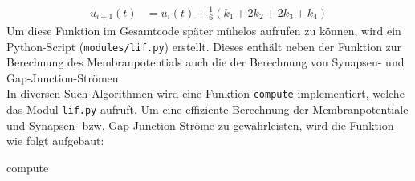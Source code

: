	\begin{align}
		\label{eq:runkgekutta_erg}
		u_{i+1}(t) &= u_i(t) + \tfrac{1}{6} (k_1 + 2 k_2 + 2 k_3 + k_4)
	\end{align}
	Um diese Funktion im Gesamtcode später mühelos aufrufen zu können, wird ein Python-Script (\texttt{modules/lif.py}) erstellt. Dieses enthält neben der Funktion zur Berechnung des Membranpotentials auch die der Berechnung von Synapsen- und Gap-Junction-Strömen.\\
	In diversen Such-Algorithmen wird eine Funktion \texttt{compute} implementiert, welche das Modul \texttt{lif.py} aufruft. Um eine effiziente Berechnung der Membranpotentiale und Synapsen- bzw. Gap-Junction Ströme zu gewährleisten, wird die Funktion wie folgt aufgebaut:
	\begin{algorithm}
		
		
		\caption{compute}
	\end{algorithm}
